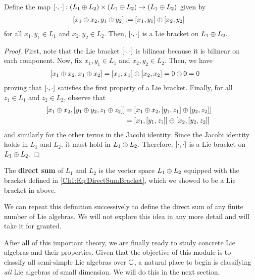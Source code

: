 \begin{boxproposition}\label{Ch1:Prop:DirectSumLieBracket}
    Define the map $\left[ \cdot, \cdot \right] : \left( L_1 \oplus L_2 \right) \times \left( L_1 \oplus L_2 \right) \to \left( L_1 \oplus L_2 \right)$ given by
    \begin{align}
        \left[ x_1 \oplus x_2, y_1 \oplus y_2 \right] := \left[ x_1, y_1 \right] \oplus \left[ x_2, y_2 \right]
        \label{Ch1:Eq:DirectSumBracket}
    \end{align}
    for all $x_1, y_1 \in L_1$ and $x_2, y_2 \in L_2$. Then, $\left[ \cdot, \cdot \right]$ is a Lie bracket on $L_1 \oplus L_2$.
\end{boxproposition}
\begin{proof} %
    First, note that the Lie bracket $\left[ \cdot, \cdot \right]$ is bilinear because it is bilinear on each component. Now, fix $x_1, y_1 \in L_1$ and $x_2, y_2 \in L_2$. Then, we have
    \begin{align*}
        \left[ x_1 \oplus x_2, x_1 \oplus x_2 \right] &= \left[ x_1, x_1 \right] \oplus \left[ x_2, x_2 \right] = 0 \oplus 0 = 0
    \end{align*}
    proving that $\left[ \cdot, \cdot \right]$ satisfies the first property of a Lie bracket. Finally, for all $z_1 \in L_1$ and $z_2 \in L_2$, observe that
    \begin{align*}
        \left[ x_1 \oplus x_2, \left[ y_1 \oplus y_2, z_1 \oplus z_2 \right] \right]
        &= \left[ x_1 \oplus x_2, \left[ y_1, z_1 \right] \oplus \left[ y_2, z_2 \right] \right] \\
        &= \left[ x_1, \left[ y_1, z_1 \right] \right] \oplus \left[ x_2, \left[ y_2, z_2 \right] \right]
    \end{align*}
    and similarly for the other terms in the Jacobi identity. Since the Jacobi identity holds in $L_1$ and $L_2$, it must hold in $L_1 \oplus L_2$. Therefore, $\left[ \cdot, \cdot \right]$ is a Lie bracket on $L_1 \oplus L_2$.
\end{proof}

\begin{boxdefinition}\label{Ch1:Def:DirectSum}
    The \textbf{direct sum} of $L_1$ and $L_2$ is the vector space $L_1 \oplus L_2$ equipped with the bracket defined in \eqref{Ch1:Eq:DirectSumBracket}, which we showed to be a Lie bracket in  above.
\end{boxdefinition}

We can repeat this definition successively to define the direct sum of any finite number of Lie algebras. We will not explore this idea in any more detail and will take it for granted.

After all of this important theory, we are finally ready to study concrete Lie algebras and their properties. Given that the objective of this module is to classify all semi-simple Lie algebras over $\mathbb{C}$, a natural place to begin is classifying \textit{all} Lie algebras of small dimension. We will do this in the next section.
